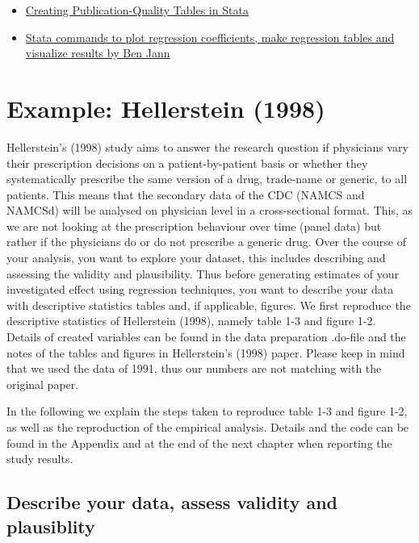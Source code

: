 \documentclass[
]{book}
\providecommand{\tightlist}{%
  \setlength{\itemsep}{0pt}\setlength{\parskip}{0pt}}
\begin{document}
\begin{itemize}
\tightlist
\item
  \href{https://ssc.wisc.edu/sscc/pubs/stata_tables.htm}{Creating
  Publication-Quality Tables in Stata}
\item
  \href{http://repec.sowi.unibe.ch/stata/}{Stata commands to plot
  regression coefficients, make regression tables and visualize results
  by Ben Jann}
\end{itemize}

\hypertarget{example-hellerstein-1998-3}{%
\section{Example: Hellerstein (1998)}\label{example-hellerstein-1998-3}}

Hellerstein's (1998) study aims to answer the research question if
physicians vary their prescription decisions on a patient-by-patient
basis or whether they systematically prescribe the same version of a
drug, trade-name or generic, to all patients. This means that the
secondary data of the CDC (NAMCS and NAMCSd) will be analysed on
physician level in a cross-sectional format. This, as we are not looking
at the prescription behaviour over time (panel data) but rather if the
physicians do or do not prescribe a generic drug. Over the course of
your analysis, you want to explore your dataset, this includes
describing and assessing the validity and plausibility. Thus before
generating estimates of your investigated effect using regression
techniques, you want to describe your data with descriptive statistics
tables and, if applicable, figures. We first reproduce the descriptive
statistics of Hellerstein (1998), namely table 1-3 and figure 1-2.
Details of created variables can be found in the data preparation
.do-file and the notes of the tables and figures in Hellerstein's (1998)
paper. Please keep in mind that we used the data of 1991, thus our
numbers are not matching with the original paper.

In the following we explain the steps taken to reproduce table 1-3 and
figure 1-2, as well as the reproduction of the empirical analysis.
Details and the code can be found in the Appendix and at the end of the
next chapter when reporting the study results.

\hypertarget{describe-your-data-assess-validity-and-plausiblity-1}{%
\subsection{Describe your data, assess validity and
plausiblity}\label{describe-your-data-assess-validity-and-plausiblity-1}}
\end{document}
